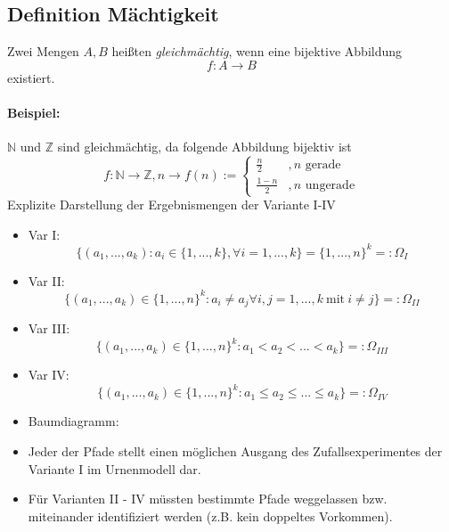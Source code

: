 \documentclass[12pt,a4paper]{article}
\begin{document}
	\subsection{Definition Mächtigkeit}
	Zwei Mengen $A,B$ heißten \textit{gleichmächtig}, wenn eine bijektive Abbildung
	$$f:A\rightarrow B$$
	existiert.
	\paragraph{Beispiel: } 
	$\mathbb{N}$ und $\mathbb{Z}$ sind gleichmächtig, da folgende Abbildung bijektiv ist	
	\[
 	f:\mathbb{N}\rightarrow\mathbb{Z},n\rightarrow f(n):=\left\{\begin{array}{lr}
 		\frac{n}{2} &,n \text{ gerade}\\
 		\frac{1-n}{2} &,n \text{ ungerade} 	
 	\end{array}\right.
 	\]
	Explizite Darstellung der Ergebnismengen der Variante I-IV
	\begin{itemize}
		\item Var I: 
		$$\{(a_1,...,a_k):a_i\in\{1,...,k\},\forall i=1,...,k\} = \{1,...,n\}^k=:\Omega_I$$
		\item Var II:
		$$\{(a_1,...,a_k)\in\{1,...,n\}^k:a_i\neq a_j \forall i,j=1,...,k\: \text{mit} \: i\neq j\} =:\Omega_{II}$$
		\item Var III:
		$$\{(a_1,...,a_k)\in\{1,...,n\}^k:a_1<a_2<...<a_k\}=:\Omega_{III}$$
		\item Var IV:
		$$\{(a_1,...,a_k)\in\{1,...,n\}^k:a_1\leq a_2\leq ...\leq a_k\}=:\Omega_{IV}$$
		\item Baumdiagramm:
	\end{itemize}		 	
\newpage
	\begin{itemize}
		\item Jeder der Pfade stellt einen möglichen Ausgang des Zufallsexperimentes der Variante I im 
		Urnenmodell dar.
		\item Für Varianten II - IV müssten bestimmte Pfade weggelassen bzw. miteinander identifiziert
		werden (z.B. kein doppeltes Vorkommen).
	\end{itemize}
\end{document}

